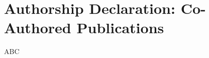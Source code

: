 \cleardoublepage
\setsinglecolumn
\chapter*{\centering \Large Authorship Declaration: Co-Authored Publications}
\thispagestyle{empty}


ABC